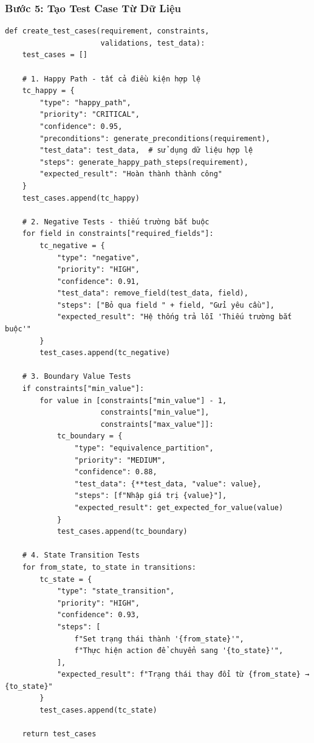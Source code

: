 \documentclass[14pt,a4paper]{article}
\begin{document}
\subsubsection{Bước 5: Tạo Test Case Từ Dữ Liệu}

\begin{lstlisting}
def create_test_cases(requirement, constraints, 
                      validations, test_data):
    test_cases = []
    
    # 1. Happy Path - tất cả điều kiện hợp lệ
    tc_happy = {
        "type": "happy_path",
        "priority": "CRITICAL",
        "confidence": 0.95,
        "preconditions": generate_preconditions(requirement),
        "test_data": test_data,  # sử dụng dữ liệu hợp lệ
        "steps": generate_happy_path_steps(requirement),
        "expected_result": "Hoàn thành thành công"
    }
    test_cases.append(tc_happy)
    
    # 2. Negative Tests - thiếu trường bắt buộc
    for field in constraints["required_fields"]:
        tc_negative = {
            "type": "negative",
            "priority": "HIGH",
            "confidence": 0.91,
            "test_data": remove_field(test_data, field),
            "steps": ["Bỏ qua field " + field, "Gửi yêu cầu"],
            "expected_result": "Hệ thống trả lỗi 'Thiếu trường bắt buộc'"
        }
        test_cases.append(tc_negative)
    
    # 3. Boundary Value Tests
    if constraints["min_value"]:
        for value in [constraints["min_value"] - 1,
                      constraints["min_value"],
                      constraints["max_value"]]:
            tc_boundary = {
                "type": "equivalence_partition",
                "priority": "MEDIUM",
                "confidence": 0.88,
                "test_data": {**test_data, "value": value},
                "steps": [f"Nhập giá trị {value}"],
                "expected_result": get_expected_for_value(value)
            }
            test_cases.append(tc_boundary)
    
    # 4. State Transition Tests
    for from_state, to_state in transitions:
        tc_state = {
            "type": "state_transition",
            "priority": "HIGH",
            "confidence": 0.93,
            "steps": [
                f"Set trạng thái thành '{from_state}'",
                f"Thực hiện action để chuyển sang '{to_state}'",
            ],
            "expected_result": f"Trạng thái thay đổi từ {from_state} → {to_state}"
        }
        test_cases.append(tc_state)
    
    return test_cases
\end{lstlisting}
\end{document}
